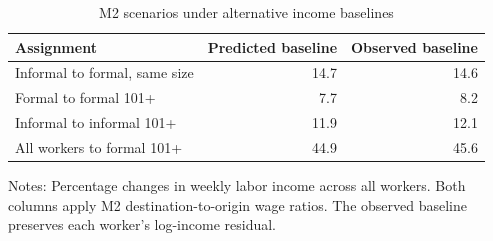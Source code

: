 \begin{table}[htbp]
\centering\small
\caption{M2 scenarios under alternative income baselines}
\label{tab:income-counterfactual-sensitivity}
\begin{tabular}{lrr}
\toprule
Assignment & Predicted baseline & Observed baseline \\
\midrule
Informal to formal, same size & 14.7 & 14.6 \\
Formal to formal 101+ & 7.7 & 8.2 \\
Informal to informal 101+ & 11.9 & 12.1 \\
All workers to formal 101+ & 44.9 & 45.6 \\
\bottomrule
\end{tabular}
\par\vspace{0.3em}
\begin{minipage}{0.97\textwidth}\footnotesize
Notes: Percentage changes in weekly labor income across all workers. Both columns apply M2 destination-to-origin wage ratios. The observed baseline preserves each worker's log-income residual.
\end{minipage}
\end{table}
